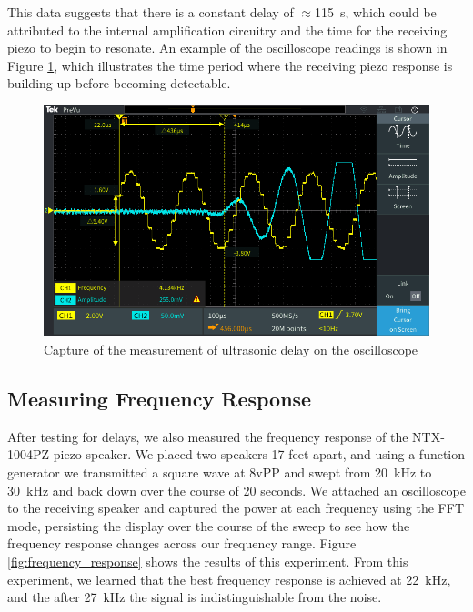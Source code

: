 \documentclass{article}
\begin{document}
    This data suggests that there is a constant delay of $\approx$\SI{115}{\second}, which could be attributed to the internal amplification circuitry and the time for the receiving piezo to begin to resonate. An example of the oscilloscope readings is shown in Figure \ref{fig:us_delay_scope}, which illustrates the time period where the receiving piezo response is building up before becoming detectable.

    \begin{figure}[H]
      \centering
      \includegraphics[width=0.8\linewidth]{./images/us_delay_scope.png}
      \caption{Capture of the measurement of ultrasonic delay on the oscilloscope}
      \label{fig:us_delay_scope}
    \end{figure}

  \subsection{Measuring Frequency Response} \label{section:frequency_response}

    After testing for delays, we also measured the frequency response of the NTX-1004PZ piezo speaker. We placed two speakers 17 feet apart, and using a function generator we transmitted a square wave at 8vPP and swept from \SI{20}{\kilo\hertz} to \SI{30}{\kilo\hertz} and back down over the course of 20 seconds. We attached an oscilloscope to the receiving speaker and captured the power at each frequency using the FFT mode, persisting the display over the course of the sweep to see how the frequency response changes across our frequency range. Figure \ref{fig:frequency_response} shows the results of this experiment. From this experiment, we learned that the best frequency response is achieved at \SI{22}{\kilo\hertz}, and the after \SI{27}{\kilo\hertz} the signal is indistinguishable from the noise.
\end{document}
